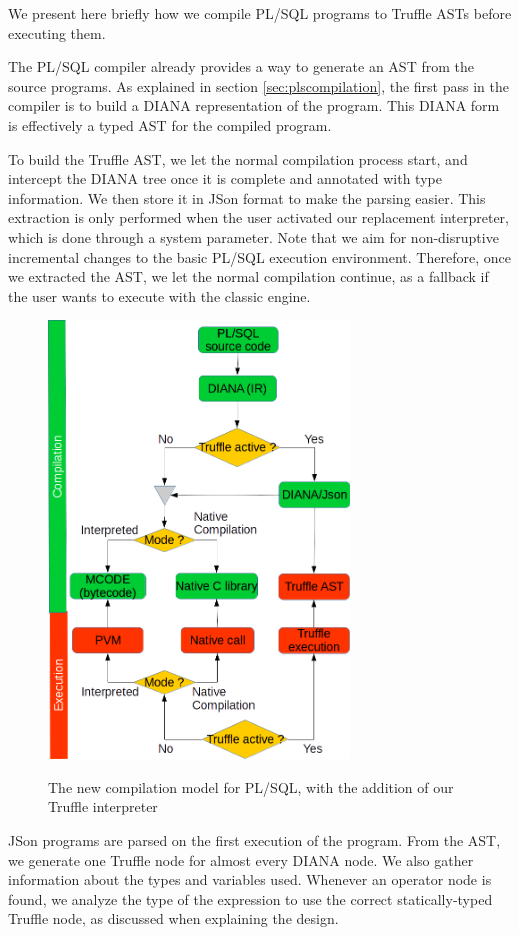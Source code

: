 \documentclass[twoside,11pt,a4paper]{article}
\begin{document}
We present here briefly how we compile PL/SQL programs to Truffle ASTs before executing them.

The PL/SQL compiler already provides a way to generate an AST from the source programs. As explained in section \ref{sec:plscompilation}, the first pass in the compiler is to build a DIANA representation of the program. This DIANA form is effectively a typed AST for the compiled program.

To build the Truffle AST, we let the normal compilation process start, and intercept the DIANA tree once it is complete and annotated with type information. We then store it in JSon format to make the parsing easier. This extraction is only performed when the user activated our replacement interpreter, which is done through a system parameter. Note that we aim for non-disruptive incremental changes to the basic PL/SQL execution environment. Therefore, once we extracted the AST, we let the normal compilation continue, as a fallback if the user wants to execute with the classic engine.

\begin{figure}[tb]
	\centering
	\includegraphics[width=8cm]{./graphs/CompilationModelExtended.png}
	\label{fig:compmodelext}
	\caption{The new compilation model for PL/SQL, with the addition of our Truffle interpreter}
\end{figure}

JSon programs are parsed on the first execution of the program. From the AST, we generate one Truffle node for almost every DIANA node. We also gather information about the types and variables used. Whenever an operator node is found, we analyze the type of the expression to use the correct statically-typed Truffle node, as discussed when explaining the design.
\end{document}
